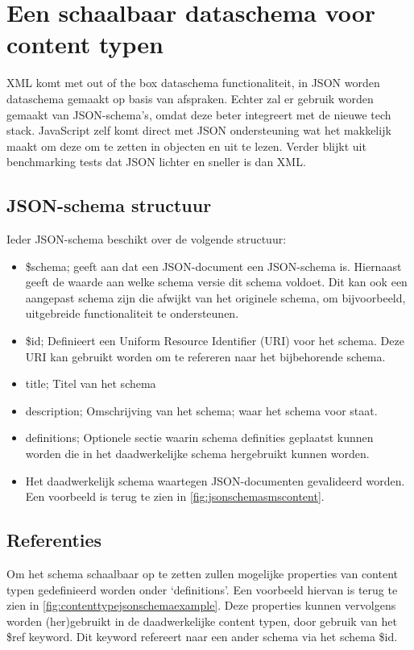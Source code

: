 \pagebreak
\section{Een schaalbaar dataschema voor content typen}
XML komt met out of the box dataschema functionaliteit, in JSON worden dataschema gemaakt op basis van afspraken. Echter zal er gebruik worden gemaakt van JSON-schema’s, omdat deze beter integreert met de nieuwe tech stack. JavaScript zelf komt direct met JSON ondersteuning wat het makkelijk maakt om deze om te zetten in objecten en uit te lezen. Verder blijkt uit benchmarking tests dat JSON lichter en sneller is dan XML\cite{Nurseitov}. 

\subsection{JSON-schema structuur}
Ieder JSON-schema beschikt over de volgende structuur:
\begin{itemize}
    \item \$schema; geeft aan dat een JSON-document een JSON-schema is. Hiernaast geeft de waarde aan welke schema versie dit schema voldoet\cite{Droettboom2016}. Dit kan ook een aangepast schema zijn die afwijkt van het originele schema, om bijvoorbeeld, uitgebreide functionaliteit te ondersteunen.
    \item \$id; Definieert een Uniform Resource Identifier (URI) voor het schema. Deze URI kan gebruikt worden om te refereren naar het bijbehorende schema.
    \item title; Titel van het schema
    \item description; Omschrijving van het schema; waar het schema voor staat.
    \item definitions; Optionele sectie waarin schema definities geplaatst kunnen worden die in het daadwerkelijke schema hergebruikt kunnen worden\cite{FoundationsJSONSchema}.
    \item Het daadwerkelijk schema waartegen JSON-documenten gevalideerd worden. Een voorbeeld is terug te zien in \autoref{fig:jsonschemasmscontent}.
\end{itemize}

\subsection{Referenties}
Om het schema schaalbaar op te zetten zullen mogelijke properties van content typen gedefinieerd worden onder ‘definitions’. Een voorbeeld hiervan is terug te zien in \autoref{fig:contenttypejsonschemaexample}. Deze properties kunnen vervolgens worden (her)gebruikt in de daadwerkelijke content typen, door gebruik van het \$ref keyword\cite{Droettboom2016}. Dit keyword refereert naar een ander schema via het schema \$id.

